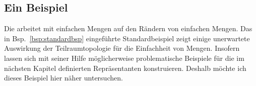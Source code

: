 % 
% 
% 
%     

    \subsection{Ein Beispiel}\label{ssec:standardbsp}
    Die \strukt arbeitet mit einfachen Mengen auf den Rändern von einfachen Mengen.
    Das in Bsp.~\ref{bsp:standardbsp} eingeführte Standardbeispiel zeigt einige unerwartete Auswirkung der Teilraumtopologie für die Einfachheit von Mengen.
    Insofern lassen sich mit seiner Hilfe möglicherweise problematische Beispiele für die im nächsten Kapitel definierten Repräsentanten konstruieren.
    Deshalb möchte ich dieses Beispiel hier näher untersuchen.
    
